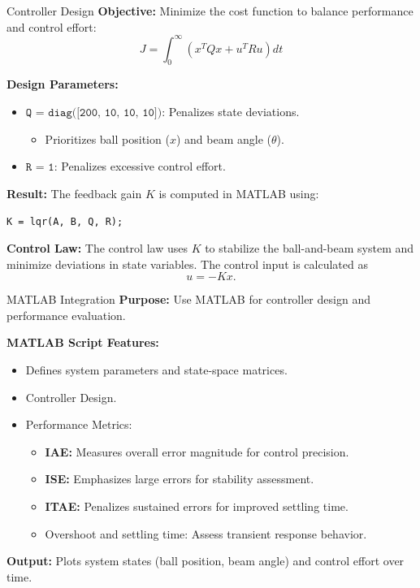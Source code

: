 \documentclass{beamer}
\begin{document}
\begin{frame}{Controller Design}
    \small
    \textbf{Objective:} Minimize the cost function to balance performance and control effort:
    \[
    J = \int_0^\infty \left( x^T Q x + u^T R u \right) dt
    \]

    \textbf{Design Parameters:}
    \begin{itemize}
        \item \(\texttt{Q = diag([200, 10, 10, 10])}\): Penalizes state deviations.
        \begin{itemize}
            \footnotesize
            \item Prioritizes ball position (\(x\)) and beam angle (\(\theta\)).
        \end{itemize}
        \item \(\texttt{R = 1}\): Penalizes excessive control effort.
    \end{itemize}

    \textbf{Result:} The feedback gain \(K\) is computed in MATLAB using:
    \begin{center}
        \texttt{K = lqr(A, B, Q, R);}
    \end{center}

    \textbf{Control Law:} The control law uses \(K\) to stabilize the ball-and-beam system and minimize deviations in state variables. The control input is calculated as
    \[
    u = -Kx.
    \]
\end{frame}

\begin{frame}{MATLAB Integration}
    \textbf{Purpose:} Use MATLAB for controller design and performance evaluation.

    \vspace{0.3cm}
    \textbf{MATLAB Script Features:}
    \begin{itemize}
        \item Defines system parameters and state-space matrices.
        \item Controller Design.
        \item Performance Metrics:
        \begin{itemize}
            \footnotesize
            \item \textbf{IAE:} Measures overall error magnitude for control precision.
            \item \textbf{ISE:} Emphasizes large errors for stability assessment.
            \item \textbf{ITAE:} Penalizes sustained errors for improved settling time.
            \item Overshoot and settling time: Assess transient response behavior.
        \end{itemize}
    \end{itemize}

    \vspace{0.3cm}
    \textbf{Output:} Plots system states (ball position, beam angle) and control effort over time.
\end{frame}
\end{document}
